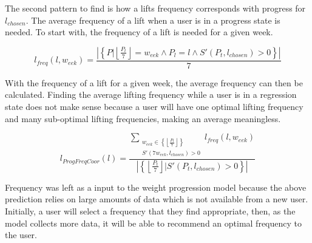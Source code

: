 The second pattern to find is how a lifts frequency corresponds with progress for $l_{chosen}$. The average frequency of a lift when a user is in a progress state is needed. To start with, the frequency of a lift is needed for a given week.

\begin{equation}
    l_{freq}(l,w_{eek})=\frac{
                    \left| \left\{ P | \left\lfloor \frac{P_t}{7} \right\rfloor=w_{eek} \land 
                    P_l=l \land
                    S'(P_t,l_{chosen})>0 \right\} \right|
                }{
                    7
                }
\end{equation}

With the frequency of a lift for a given week, the average frequency can then be calculated. Finding the average lifting frequency while a user is in a regression state does not make sense because a user will have one optimal lifting frequency and many sub-optimal lifting frequencies, making an average meaningless.

\begin{equation}
    l_{ProgFreqCoor}(l)=\frac{
                            \sum_{
                            \substack{
                                    w_{eek}\in \left\{ \left\lfloor \frac{P_t}{7} \right\rfloor \right\}\\
                                    S'(7w_{eek},l_{chosen})>0
                                }
                            }
                        l_{freq}(l,w_{eek})
                        }{
                            \left|\left\{ \left\lfloor \frac{P_t}{7} \right\rfloor | S'(P_t,l_{chosen})>0 \right\}\right|
                        }
\end{equation}

Frequency was left as a input to the weight progression model because the above prediction relies on large amounts of data which is not available from a new user. Initially, a user will select a frequency that they find appropriate, then, as the model collects more data, it will be able to recommend an optimal frequency to the user.